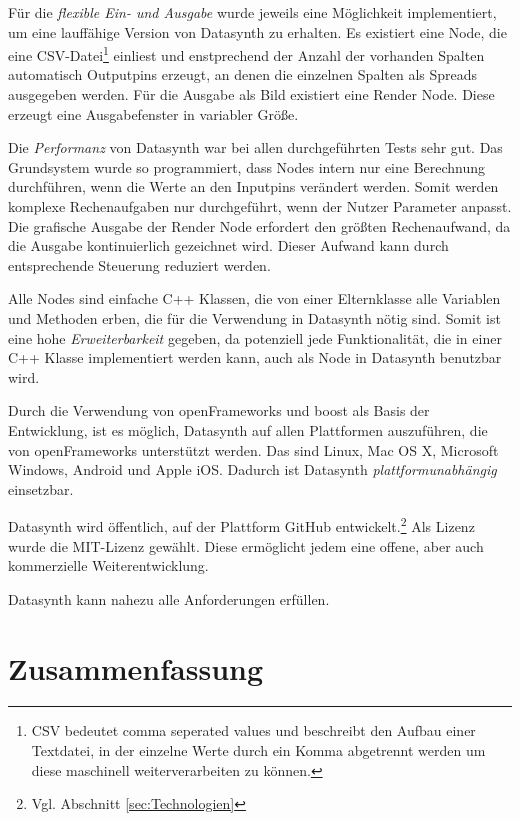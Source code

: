 \documentclass[a4paper, 12pt, DIV=calc, version=first, pdftex, headsepline, footsepline, bibtotocnumbered, liststotocnumbered]{scrreprt}
\begin{document}
Für die \textit{flexible Ein- und Ausgabe} wurde jeweils eine Möglichkeit implementiert, um eine lauffähige
Version von Datasynth zu erhalten. Es existiert eine Node, die eine CSV-Datei\footnote{CSV
bedeutet comma seperated values und beschreibt den Aufbau einer Textdatei, in der einzelne Werte durch
ein Komma abgetrennt werden um diese maschinell weiterverarbeiten zu können.} einliest und enstprechend der Anzahl der vorhanden
Spalten automatisch Outputpins erzeugt, an denen die einzelnen Spalten als
Spreads ausgegeben werden. Für die Ausgabe als Bild existiert eine Render Node.
Diese erzeugt eine Ausgabefenster in variabler Größe.

Die \textit{Performanz} von Datasynth war bei allen durchgeführten Tests sehr gut. Das Grundsystem wurde so
programmiert, dass Nodes intern nur eine Berechnung durchführen, wenn die Werte
an den Inputpins verändert werden. Somit werden komplexe Rechenaufgaben nur
durchgeführt, wenn der Nutzer Parameter anpasst. Die grafische Ausgabe
der Render Node erfordert den größten Rechenaufwand, da die Ausgabe kontinuierlich
gezeichnet wird. Dieser Aufwand kann durch entsprechende Steuerung
reduziert werden.

Alle Nodes sind einfache C++ Klassen, die von einer Elternklasse
alle Variablen und Methoden erben, die für die Verwendung in Datasynth
nötig sind. Somit ist eine hohe \textit{Erweiterbarkeit} gegeben, da potenziell jede
Funktionalität, die in einer C++ Klasse implementiert werden kann, auch
als Node in Datasynth benutzbar wird.

Durch die Verwendung von openFrameworks und boost als Basis der Entwicklung,
ist es möglich, Datasynth auf allen Plattformen auszuführen, die von openFrameworks
unterstützt werden. Das sind Linux, Mac OS X, Microsoft Windows, Android
und Apple iOS. Dadurch ist Datasynth \textit{plattformunabhängig} einsetzbar.

Datasynth wird öffentlich, auf der Plattform GitHub entwickelt.\footnote{Vgl.
Abschnitt \ref{sec:Technologien}} Als Lizenz wurde die MIT-Lizenz gewählt.
Diese ermöglicht jedem eine offene, aber auch kommerzielle Weiterentwicklung.

Datasynth kann nahezu alle Anforderungen erfüllen. 

\chapter{Zusammenfassung}
\label{cha:Zusammenfassung}
\end{document}
